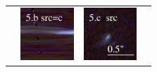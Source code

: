\documentclass[useAMS,usenatbib]{mn2e}
\begin{document}
\begin{table}
\begin{tabular}{cccc}
    & \multicolumn{1}{m{1.7cm}}{\includegraphics[height=2.00cm,clip]{figs/enfw_img/rgb.pre_5_b_c_tri.ps}}
    & \multicolumn{1}{m{1.7cm}}{\includegraphics[height=2.00cm,clip]{figs/enfw_img/rgb.src_5_c.ps}} \\
  \end{tabular}

\end{table}
\end{document}
